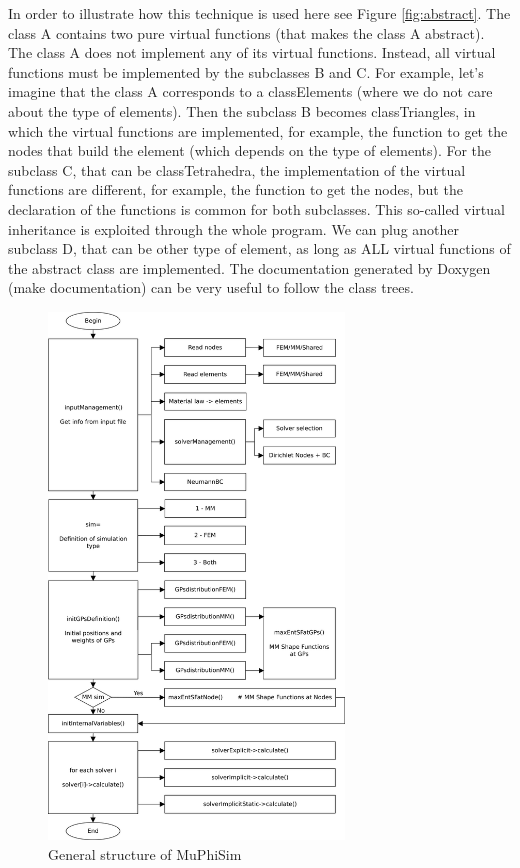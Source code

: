 \documentclass[oneside,11pt,times]{book}
\begin{document}
In order to illustrate how this technique is used here see Figure \ref{fig:abstract}. The class A contains two pure virtual functions (that makes the class A abstract). The class A does not implement any of its virtual functions. Instead, all virtual functions must be implemented by the subclasses B and C. For example, let's imagine that the class A corresponds to a classElements (where we do not care about the type of elements). Then the subclass B becomes classTriangles, in which the virtual functions are implemented, for example, the function to get the nodes that build the element (which depends on the type of elements). For the subclass C, that can be classTetrahedra, the implementation of the virtual functions are different, for example, the function to get the nodes, but the declaration of the functions is common for both subclasses. This so-called virtual inheritance is exploited through the whole program. We can plug another subclass D, that can be other type of element, as long as ALL virtual functions of the abstract class are implemented. The documentation generated by Doxygen (make documentation) can be very useful to follow the class trees.


\begin{figure}[htb]
\centering
\includegraphics[width=0.7\textwidth]{imgs/UserManual/structure_MuPhiSim.png}
\caption{General structure of MuPhiSim}
\label{fig:generalStruct}
\end{figure}
\end{document}
